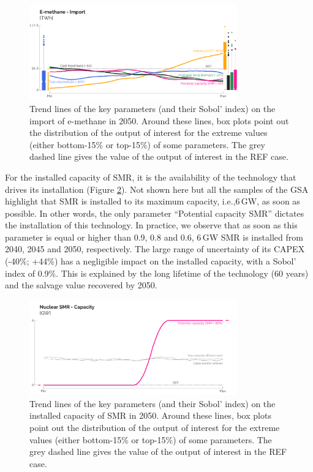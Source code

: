 \documentclass[11pt,twoside,a4paper,english]{article}
\def\ie{i.e.,}
\begin{document}
\begin{figure}[htbp!]
\centering
\includegraphics[width=0.8\textwidth]{UQ_Gas_samples_2.pdf}
\caption{Trend lines of the key parameters (and their Sobol' index) on the import of e-methane in 2050. Around these lines, box plots point out the distribution of the output of interest for the extreme values (either bottom-15\% or top-15\%) of some parameters. The grey dashed line gives the value of the output of interest in the REF case. }
\label{fig:results_uq_samples_gas}
\end{figure}

For the installed capacity of \gls{SMR}, it is the availability of the technology that drives its installation (Figure \ref{fig:results_uq_samples_SMR}). Not shown here but all the samples of the \gls{GSA} highlight that \gls{SMR} is installed to its maximum capacity, \ie 6\,GW, as soon as possible. In other words, the only parameter ``Potential capacity \gls{SMR}'' dictates the installation of this technology. In practice, we observe that as soon as this parameter is equal or higher than 0.9, 0.8 and 0.6, 6\,GW \gls{SMR} is installed from 2040, 2045 and 2050, respectively. The large range of uncertainty of its CAPEX (-40\%; +44\%) has a negligible impact on the installed capacity, with a Sobol' index of 0.9\%. This is explained by the long lifetime of the technology (60 years) and the salvage value recovered by 2050.

\begin{figure}[htbp!]
\centering
\includegraphics[width=0.8\textwidth]{UQ_SMR_samples_2.pdf}
\caption{Trend lines of the key parameters (and their Sobol' index) on the installed capacity of \gls{SMR} in 2050. Around these lines, box plots point out the distribution of the output of interest for the extreme values (either bottom-15\% or top-15\%) of some parameters. The grey dashed line gives the value of the output of interest in the REF case. }
\label{fig:results_uq_samples_SMR}
\end{figure}
\end{document}
